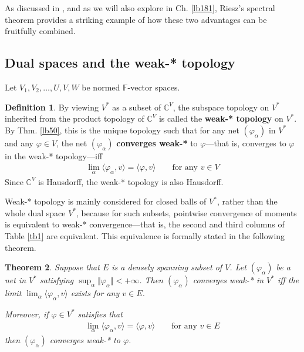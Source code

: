 \documentclass[12pt,b5paper,notitlepage]{article}
\theoremstyle{definition}
\newtheorem{df}{Definition}[subsection]
\theoremstyle{plain}
\newtheorem{thm}[df]{Theorem}
\newcommand{\bk}[1]{\langle {#1}\rangle}
\newcommand{\Cbb}{\mathbb C}
\newcommand{\Fbb}{\mathbb F}
\numberwithin{equation}{section}
\begin{document}
As discussed in \cite[Sec. 25.8, 25.9]{Gui-A}, and as we will also explore in Ch. \ref{lb181}, Riesz’s spectral theorem provides a striking example of how these two advantages can be fruitfully combined.



\subsection{Dual spaces and the weak-* topology}


Let $V_1,V_2,\dots,U,V,W$ be normed $\Fbb$-vector spaces.


\begin{df}
By viewing $V^*$ as a subset of $\Cbb^V$, the subspace topology on $V^*$ inherited from the product topology of $\Cbb^V$ is called the \textbf{weak-* topology}  on $V^*$. By Thm. \ref{lb50}, this is the unique topology such that for any net $(\varphi_\alpha)$ in $V^*$ and any $\varphi\in V$, the net $(\varphi_\alpha)$ \textbf{converges weak-*}  to $\varphi$---that is, converges to $\varphi$ in the weak-* topology---iff 
\begin{align}\label{eq49}
\lim_\alpha\bk{\varphi_\alpha,v}=\bk{\varphi,v}\qquad\text{for any }v\in V
\end{align}
Since $\Cbb^V$ is Hausdorff, the weak-* topology is also Hausdorff.
\end{df}



Weak-* topology is mainly considered for closed balls of $V^*$, rather than the whole dual space $V^*$, because for such subsets, pointwise convergence of moments is equivalent to weak-* convergence---that is, the second and third columns of Table \ref{tb1} are equivalent. This equivalence is formally stated in the following theorem.

\begin{thm}\label{lb80}
Suppose that $E$ is a densely spanning subset of $V$. Let $(\varphi_\alpha)$ be a net in $V^*$ satisfying $\sup_\alpha\Vert\varphi_\alpha\Vert<+\infty$. Then $(\varphi_\alpha)$ converges weak-* in $V^*$ iff the limit $\lim_\alpha\bk{\varphi_\alpha,v}$ exists for any $v\in E$. 

Moreover, if  $\varphi\in V^*$ satisfies that
\begin{align*}
\lim_\alpha\bk{\varphi_\alpha,v}=\bk{\varphi,v}\qquad\text{for any }v\in E
\end{align*}
then $(\varphi_\alpha)$ converges weak-* to $\varphi$.
\end{thm}
\end{document}
